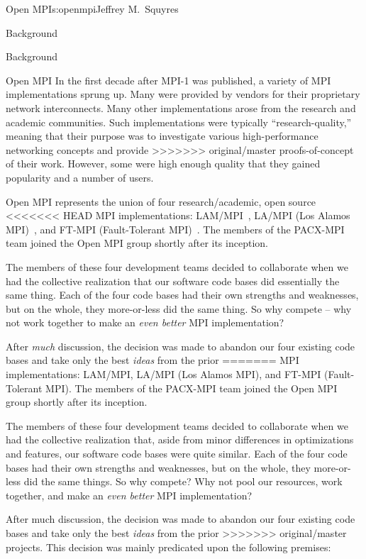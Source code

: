 \begin{aosachapter}{Open MPI}{s:openmpi}{Jeffrey M.\ Squyres}
\begin{aosasect1}{Background}
\begin{aosasect1}{Background}
\begin{aosasect2}{Open MPI}
In the first decade after MPI-1 was published, a variety of MPI
implementations sprung up.  Many were provided by vendors for their
proprietary network interconnects.  Many other implementations arose
from the research and academic communities.  Such implementations were
typically ``research-quality,'' meaning that their purpose was to
investigate various high-performance networking concepts and provide
>>>>>>> original/master
proofs-of-concept of their work.  However, some were high enough
quality that they gained popularity and a number of users.

Open MPI represents the union of four research/academic, open source
<<<<<<< HEAD
MPI implementations: LAM/MPI~\cite{squyres03:_compon_archit_lam_mpi},
LA/MPI (Los Alamos MPI)~\cite{lampi:ijjp}, and FT-MPI (Fault-Tolerant
MPI)~\cite{fagg04:_fault_toler_commun_librar_applic_high_perof}.
%
The members of the PACX-MPI~\cite{keller2003:pacx:jogc} team joined
the Open MPI group shortly after its inception.

The members of these four development teams decided to collaborate
when we had the collective realization that our software code bases
did essentially the same thing.  Each of the four code bases had their
own strengths and weaknesses, but on the whole, they more-or-less did
the same thing.  So why compete -- why not work together to make an
{\em even better} MPI implementation?

After {\em much} discussion, the decision was made to abandon our four
existing code bases and take only the best {\em ideas} from the prior
=======
MPI implementations: LAM/MPI, LA/MPI (Los Alamos MPI), and FT-MPI
(Fault-Tolerant MPI).
%
The members of the PACX-MPI team joined the Open MPI group shortly
after its inception.

The members of these four development teams decided to collaborate
when we had the collective realization that, aside from minor
differences in optimizations and features, our software code bases
were quite similar.  Each of the four code bases had their own
strengths and weaknesses, but on the whole, they more-or-less did the
same things.  So why compete?  Why not pool our resources, work
together, and make an \emph{even better} MPI implementation?

After much discussion, the decision was made to abandon our four
existing code bases and take only the best \emph{ideas} from the prior
>>>>>>> original/master
projects.  This decision was mainly predicated upon the following
premises:


\end{aosasect2}
\end{aosasect1}
\end{aosasect1}
\end{aosachapter}
